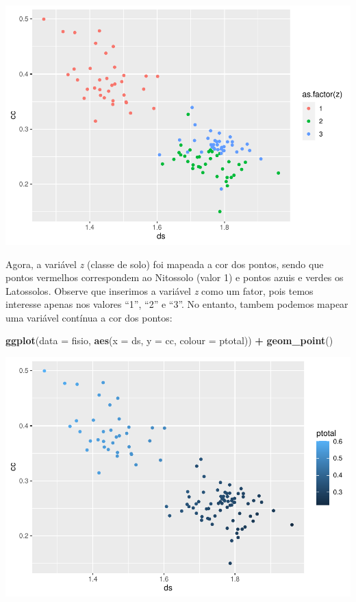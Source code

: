 \documentclass[
]{book}
\newenvironment{Shaded}{\begin{snugshade}}{\end{snugshade}}
\newcommand{\DataTypeTok}[1]{\textcolor[rgb]{0.13,0.29,0.53}{#1}}
\newcommand{\KeywordTok}[1]{\textcolor[rgb]{0.13,0.29,0.53}{\textbf{#1}}}
\newcommand{\NormalTok}[1]{#1}
\newcommand{\OperatorTok}[1]{\textcolor[rgb]{0.81,0.36,0.00}{\textbf{#1}}}
\newcommand{\StringTok}[1]{\textcolor[rgb]{0.31,0.60,0.02}{#1}}
\begin{document}
\includegraphics{TudodoR_files/figure-latex/unnamed-chunk-187-1.pdf}

Agora, a variável \emph{z} (classe de solo) foi mapeada a cor dos pontos, sendo que pontos vermelhos correspondem ao Nitossolo (valor 1) e pontos azuis e verdes os Latossolos. Observe que inserimos a variável \emph{z} como um fator, pois temos interesse apenas nos valores ``1'', ``2'' e ``3''. No entanto, tambem podemos mapear uma variável contínua a cor dos pontos:

\begin{Shaded}
\begin{Highlighting}[]
\KeywordTok{ggplot}\NormalTok{(}\DataTypeTok{data =}\NormalTok{ fisio, }\KeywordTok{aes}\NormalTok{(}\DataTypeTok{x =}\NormalTok{ ds, }\DataTypeTok{y =}\NormalTok{ cc, }\DataTypeTok{colour =}\NormalTok{ ptotal)) }\OperatorTok{+}
\StringTok{  }\KeywordTok{geom_point}\NormalTok{()}
\end{Highlighting}
\end{Shaded}

\includegraphics{TudodoR_files/figure-latex/unnamed-chunk-188-1.pdf}
\end{document}

